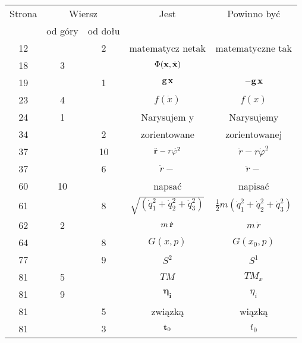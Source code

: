 \documentclass[a4paper,11pt]{article}
\begin{document}
\newpage



\begin{center}

  \begin{tabular}{|c|c|c|c|c|}
    \hline
    Strona & \multicolumn{2}{c|}{Wiersz} & Jest
                              & Powinno być \\ \cline{2-3}
    & od góry & od dołu & & \\
    \hline
    12  & &  2 & matematycz netak & matematyczne tak \\
    18  &  3 & & $\Phi( \mathbf{x}, \dot{ \mathbf{x} } )$
           & %
    \\
    19  & &  1 & $\mathbf{g}\, \mathbf{x}$ & $-\mathbf{g}\, \mathbf{x}$ \\
    23  &  4 & & $f( \dot{ x } )$ & $f( x )$ \\
    24  &  1 & & Narysujem y & Narysujemy \\
    34  & &  2 & zorientowane & zorientowanej \\
    37  & & 10 & $\ddot{ \mathbf{r} } - r \dot{ \varphi }^{ 2 }$
           & $\ddot{ r } - r \dot{ \varphi }^{ 2 }$ \\
    37  & &  6 & $\dot{ r } -$ & $\ddot{ r } -$ \\
    60  & 10 & & napsać & napisać \\
    61  & &  8 & $\sqrt{ ( \dot{ q }_{ 1 }^{ 2 } + \dot{ q }_{ 2 }^{ 2 }
                 + \dot{ q }_{ 3 }^{ 2 } ) }$
           & $\frac{ 1 }{ 2 } m ( \dot{ q }_{ 1 }^{ 2 } + \dot{ q }_{ 2 }^{ 2 }
             + \dot{ q }_{ 3 }^{ 2 } )$ \\
    62  &  2 & & $m\, \dot{ \mathbf{r} }$ & $m\, \dot{ r }$ \\
    64  & &  8 & $G( x, p )$ & $G( x_{ 0 }, p )$ \\
    77  & &  9 & $S^{ 2 }$ & $S^{ 1 }$ \\
    81  &  5 & & $TM$ & $TM_{ x }$ \\
    81  &  9 & & $\mathbf{ \eta_{ i } }$ & $\eta_{ i }$ \\
    81  & &  5 & związką & wiązką \\
    81  & &  3 & $\mathbf{t}_{ 0 }$ & $t_{ 0 }$ \\

\end{tabular}
\end{center}
\end{document}
